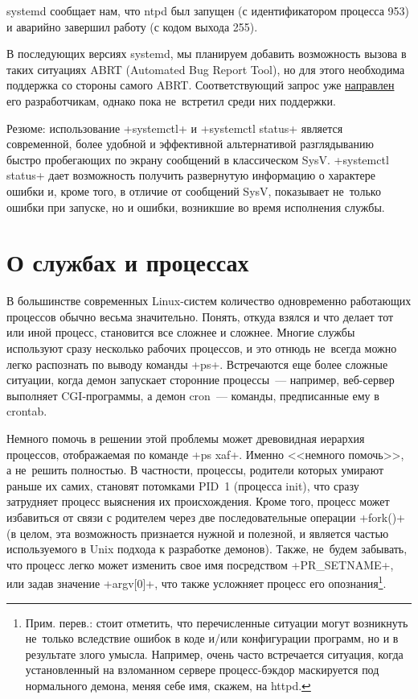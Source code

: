 \documentclass[10pt,oneside,a4paper]{article}
\begin{document}
systemd сообщает нам, что ntpd был запущен (с идентификатором процесса 953) и
аварийно завершил работу (с кодом выхода 255).

В последующих версиях systemd, мы планируем добавить возможность вызова в
таких ситуациях ABRT (Automated Bug Report Tool), но для этого необходима
поддержка со стороны самого ABRT. Соответствующий запрос уже
\href{https://bugzilla.redhat.com/show_bug.cgi?id=622773}{направлен} его
разработчикам, однако пока не~встретил среди них поддержки.

Резюме: использование +systemctl+ и +systemctl status+ является современной,
более удобной и эффективной альтернативой разглядыванию быстро пробегающих по
экрану сообщений в классическом SysV. +systemctl status+ дает возможность
получить развернутую информацию о характере ошибки и, кроме того, в отличие
от сообщений SysV, показывает не~только ошибки при запуске, но и ошибки,
возникшие во время исполнения службы. 

\section{О службах и процессах}
В большинстве современных Linux-систем количество одновременно работающих
процессов обычно весьма значительно. Понять, откуда взялся и что делает тот
или иной процесс, становится все сложнее и сложнее. Многие службы используют
сразу несколько рабочих процессов, и это отнюдь не~всегда можно легко
распознать по выводу команды +ps+. Встречаются еще более сложные ситуации,
когда демон запускает сторонние процессы~--- например, веб-сервер выполняет
CGI-программы, а демон cron~--- команды, предписанные ему в crontab.

Немного помочь в решении этой проблемы может древовидная иерархия процессов,
отображаемая по команде +ps xaf+. Именно <<немного помочь>>, а не~решить
полностью. В частности, процессы, родители которых умирают раньше их самих,
становят потомками PID~1 (процесса init), что сразу затрудняет процесс
выяснения их происхождения. Кроме того, процесс может избавиться от связи с
родителем через две последовательные операции +fork()+ (в целом, эта возможность
признается нужной и полезной, и является частью используемого в Unix подхода
к разработке демонов). Также, не~будем забывать, что процесс легко может
изменить свое имя посредством +PR_SETNAME+, или задав значение
+argv[0]+, что также усложняет процесс его опознания\footnote{Прим.
перев.: стоит отметить, что перечисленные ситуации могут возникнуть не~только
вследствие ошибок в коде и/или конфигурации программ, но и в результате злого
умысла. Например, очень часто встречается ситуация, когда установленный на
взломанном сервере процесс-бэкдор маскируется под нормального демона, меняя
себе имя, скажем, на httpd.}.
\end{document}
